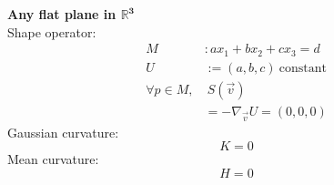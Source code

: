 \documentclass{article}
\newcommand{\R}{\mathbb{R}}
\theoremstyle{definition}
\theoremstyle{remark}
\theoremstyle{example}
\begin{document}
\begin{enumerate}
		\pagebreak
		
		\textbf{Any flat plane in $\mathbf{\R^3}$}\\
		Shape operator:
		\begin{align*}
			M&:ax_1+bx_2+cx_3=d\\
			U&:=(a,b,c)\ \mathrm{constant}\\
			\forall p \in M,&\ S(\vec{v})\\
			&=-\nabla_{\vec{v}}U=(0,0,0)	
		\end{align*}
		Gaussian curvature:
		\[K=0\]
		Mean curvature:
		\[H=0\]
	\end{enumerate}
\end{document}
